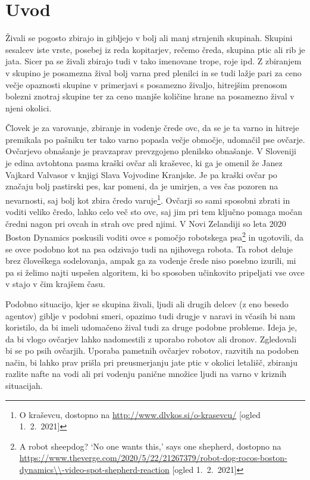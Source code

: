 \section{Uvod}

Živali se pogosto zbirajo in gibljejo v bolj ali manj strnjenih skupinah. Skupini sesalcev iste vrste, posebej iz reda kopitarjev, rečemo čreda, skupina ptic ali rib je jata. Sicer pa se živali zbirajo tudi v tako imenovane trope, roje ipd. Z zbiranjem v skupino je posamezna žival bolj varna pred plenilci in se tudi lažje pari za ceno večje opaznosti skupine v primerjavi s posamezno živaljo, hitrejšim prenosom bolezni znotraj skupine ter za ceno manjše količine hrane na posamezno žival v njeni okolici.

Človek je za varovanje, zbiranje in vodenje črede ovc, da se je ta varno in hitreje premikala po pašniku ter tako varno popasla večje območje, udomačil pse ovčarje. Ovčarjevo obnašanje je pravzaprav prevzgojeno plenilsko obnašanje. V Sloveniji je edina avtohtona pasma kraški ovčar ali kraševec, ki ga je omenil že Janez Vajkard Valvasor v knjigi Slava Vojvodine Kranjske. Je pa kraški ovčar po značaju bolj pastirski pes, kar pomeni, da je umirjen, a ves čas pozoren na nevarnosti, saj bolj kot zbira čredo varuje\footnote{O kraševcu, dostopno na \url{http://www.dlvkos.si/o-krasevcu/} [ogled 1.\ 2.\ 2021]}.
Ovčarji so sami sposobni zbrati in voditi veliko čredo, lahko celo več sto ovc, saj jim pri tem ključno pomaga močan čredni nagon pri ovcah in strah ovc pred njimi. V Novi Zelandiji so leta 2020 Boston Dynamics poskusili voditi ovce s pomočjo robotskega psa\footnote{A robot sheepdog? ‘No one wants this,’ says one shepherd, dostopno na\\  \url{https://www.theverge.com/2020/5/22/21267379/robot-dog-rocos-boston-dynamics\\-video-spot-shepherd-reaction} [ogled 1.\ 2.\ 2021]} in ugotovili, da se ovce podobno kot na psa odzivajo tudi na njihovega robota. Ta robot deluje brez človeškega sodelovanja, ampak ga za vodenje črede niso posebno izurili, mi pa si želimo najti uspešen algoritem, ki bo sposoben učinkovito pripeljati vse ovce v stajo v čim krajšem času. 

Podobno situacijo, kjer se skupina živali, ljudi ali drugih delcev (z eno besedo agentov) giblje v podobni smeri, opazimo tudi drugje v naravi in včasih bi nam koristilo, da bi imeli udomačeno žival tudi za druge podobne probleme.  Ideja je, da bi vlogo ovčarjev lahko nadomestili z uporabo robotov ali dronov. Zgledovali bi se po psih ovčarjih. Uporaba pametnih ovčarjev robotov, razvitih na podoben način, bi lahko prav prišla pri preusmerjanju jate ptic v okolici letališč, zbiranju razlite nafte na vodi ali pri vodenju panične množice ljudi na varno v kriznih situacijah.

